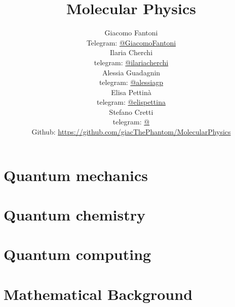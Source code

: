 

\title{\Huge \textbf{Molecular Physics}}

\author{
  Giacomo Fantoni \\
  \small Telegram: \href{https://t.me/GiacomoFantoni}{@GiacomoFantoni} \\[3pt]
  Ilaria Cherchi\\
  \small telegram: \href{https://t.me/ilariacherchi}{@ilariacherchi} \\[3pt]
  Alessia Guadagnin\\
  \small telegram: \href{https://t.me/alessiagp}{@alessiagp} \\[3pt]
  Elisa Pettin\`a\\
  \small telegram: \href{https://t.me/elisapettina}{@elispettina} \\[3pt]
  Stefano Cretti\\
  \small telegram: \href{https://t.me/}{@} \\[3pt]
\small Github: \href{https://github.com/giacThePhantom/MolecularPhysics}{https://github.com/giacThePhantom/MolecularPhysics}}

\maketitle
\tableofcontents

  \part{Quantum mechanics}

    
    
    
    

  \part{Quantum chemistry}

    
    
    

  \part{Quantum computing}

   

  \part{Mathematical Background}

    
    
    
    
    
    
    



